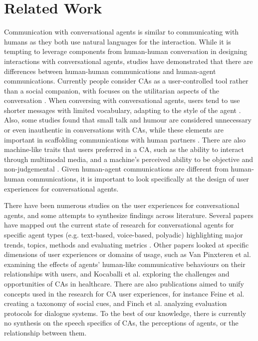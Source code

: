 
\section{Related Work}

Communication with conversational agents is similar to communicating with humans as they both use natural languages for the interaction. While it is tempting to leverage components from human-human conversation in designing interactions with conversational agents, studies have demonstrated that there are differences between human-human communications and human-agent communications. Currently people consider CAs as a user-controlled tool rather than a social companion, with focuses on the utilitarian aspects of the conversation \cite{clark2019makes}\cmt{[1]}. When conversing with conversational agents, users tend to use shorter messages with limited vocabulary, adapting to the style of the agent \cite{hill2015real}. Also, some studies found that small talk and humour are considered unnecessary or even inauthentic in conversations with CAs, while these elements are important in scaffolding communications with human partners \cite{clark2019makes}\cmt{[1]}\cite{doyle2019mapping}\cmt{[2]}. There are also machine-like traits that users preferred in a CA, such as the ability to interact through multimodal media, and a machine's perceived ability to be objective and non-judgemental \cite{doyle2019mapping}\cmt{[2]}\cite{kim2022understanding}\cmt{[3]}. Given human-agent communications are different from human-human communications, it is important to look specifically at the design of user experiences for conversational agents.

There have been numerous studies on the user experiences for conversational agents, and some attempts to synthesize findings across literature. Several papers have mapped out the current state of research for conversational agents for specific agent types (e.g. text-based, voice-based, polyadic) highlighting major trends, topics, methods and evaluating metrics \cite{clark2019state}\cmt{[33]}\cite{rapp2021human}\cmt{[5]}\cite{zheng2022ux}. Other papers looked at specific dimensions of user experiences or domains of usage, such as Van Pinxteren et al. \cite{van2020human} examining the effects of agents' human-like communicative behaviours on their relationships with users, and Kocaballi et al. \cite{kocaballi2022design} exploring the challenges and opportunities of CAs in healthcare. There are also publications aimed to unify concepts used in the research for CA user experiences, for instance Feine et al. \cite{feine2019taxonomy} creating a taxonomy of social cues, and Finch et al. \cite{finch2020towards} analyzing evaluation protocols for dialogue systems. To the best of our knowledge, there is currently no synthesis on the speech specifics of CAs, the perceptions of agents, or the relationship between them.

